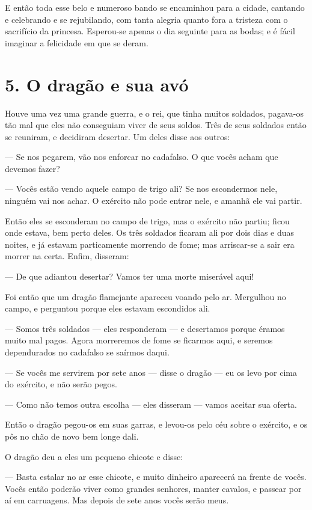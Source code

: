 E então toda esse belo e numeroso bando se encaminhou para a cidade,
cantando e celebrando e se rejubilando, com tanta alegria quanto fora
a tristeza com o sacrifício da princesa. Esperou-se apenas o dia
seguinte para as bodas; e é fácil imaginar a felicidade em que se
deram.

\chapter{5. O dragão e sua avó}

Houve uma vez uma grande guerra, e o rei, que tinha muitos soldados,
pagava-os tão mal que eles não conseguiam viver de seus soldos. Três
de seus soldados então se reuniram, e decidiram desertar. Um deles
disse aos outros:

— Se nos pegarem, vão nos enforcar no cadafalso. O que vocês acham que
devemos fazer?

— Vocês estão vendo aquele campo de trigo ali? Se nos escondermos
nele, ninguém vai nos achar. O exército não pode entrar nele, e
amanhã ele vai partir.

Então eles se esconderam no campo de trigo, mas o exército não partiu;
ficou onde estava, bem perto deles. Os três soldados ficaram ali por
dois dias e duas noites, e já estavam particamente morrendo de fome;
mas arriscar-se a sair era morrer na certa. Enfim, disseram:

— De que adiantou desertar? Vamos ter uma morte miserável aqui!

Foi então que um dragão flamejante apareceu voando pelo ar. Mergulhou
no campo, e perguntou porque eles estavam escondidos ali.

— Somos três soldados — eles responderam — e desertamos porque éramos
muito mal pagos. Agora morreremos de fome se ficarmos aqui, e seremos
dependurados no cadafalso se saírmos daqui.

— Se vocês me servirem por sete anos — disse o dragão — eu os levo por
cima do exército, e não serão pegos.

— Como não temos outra escolha — eles disseram — vamos aceitar sua
oferta.

Então o dragão pegou-os em suas garras, e levou-os pelo céu sobre o
exército, e os pôs no chão de novo bem longe dali.

O dragão deu a eles um pequeno chicote e disse:

— Basta estalar no ar esse chicote, e muito dinheiro aparecerá na
frente de vocês. Vocês então poderão viver como grandes senhores,
manter cavalos, e passear por aí em carruagens. Mas depois de sete
anos vocês serão meus.

